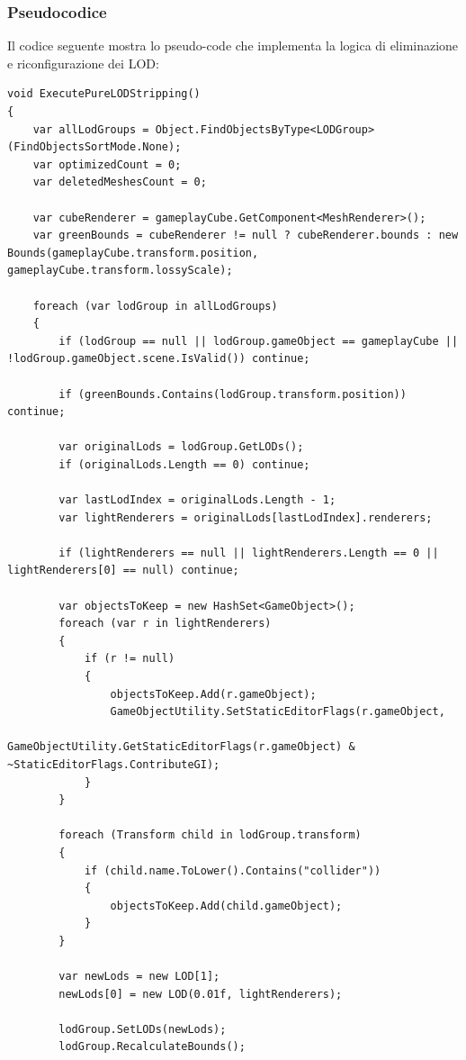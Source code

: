 \subsubsection{Pseudocodice}

Il codice seguente mostra lo pseudo-code che implementa la logica di eliminazione e riconfigurazione dei LOD:

\begin{lstlisting}[language=pseudo, caption={Pseudo-code dello LOD Stripper.}]
void ExecutePureLODStripping()
{
    var allLodGroups = Object.FindObjectsByType<LODGroup>(FindObjectsSortMode.None);
    var optimizedCount = 0;
    var deletedMeshesCount = 0;

    var cubeRenderer = gameplayCube.GetComponent<MeshRenderer>();
    var greenBounds = cubeRenderer != null ? cubeRenderer.bounds : new Bounds(gameplayCube.transform.position, gameplayCube.transform.lossyScale);

    foreach (var lodGroup in allLodGroups)
    {
        if (lodGroup == null || lodGroup.gameObject == gameplayCube || !lodGroup.gameObject.scene.IsValid()) continue;

        if (greenBounds.Contains(lodGroup.transform.position)) continue;

        var originalLods = lodGroup.GetLODs();
        if (originalLods.Length == 0) continue;

        var lastLodIndex = originalLods.Length - 1;
        var lightRenderers = originalLods[lastLodIndex].renderers;

        if (lightRenderers == null || lightRenderers.Length == 0 || lightRenderers[0] == null) continue;

        var objectsToKeep = new HashSet<GameObject>();
        foreach (var r in lightRenderers)
        {
            if (r != null)
            {
                objectsToKeep.Add(r.gameObject);
                GameObjectUtility.SetStaticEditorFlags(r.gameObject, 
                    GameObjectUtility.GetStaticEditorFlags(r.gameObject) & ~StaticEditorFlags.ContributeGI);
            }
        }

        foreach (Transform child in lodGroup.transform)
        {
            if (child.name.ToLower().Contains("collider"))
            {
                objectsToKeep.Add(child.gameObject);
            }
        }

        var newLods = new LOD[1];
        newLods[0] = new LOD(0.01f, lightRenderers);
        
        lodGroup.SetLODs(newLods);
        lodGroup.RecalculateBounds();


\end{lstlisting}
